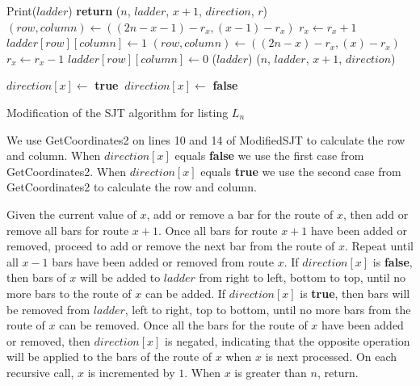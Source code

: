 \begin{algorithm}
  \begin{algorithmic}[1]
         {\sc Print}($ladder$)\EndIf
        \State \textbf{return}
      \EndIf
          ($n$, $ladder$, $x+1$, $direction$, $r$)
        \Else 
            \State $(row,column) \gets ((2n-x-1)-r_{x},(x-1)-r_{x})$
            \State $r_{x} \gets r_{x}+1$ 
            \State $ladder[row][column] \gets 1$
          \Else
            \State $(row,column) \gets ((2n-x)-r_{x},(x)-r_{x})$
            \State $r_{x} \gets r_{x}-1$ 
            \State $ladder[row][column] \gets 0$
          \EndIf
          ($ladder$)
          ($n$, $ladder$, $x+1$, $direction$)
        \EndIf
        
      \EndFor
       $direction[x] \gets$ \textbf{true}
      \Else $\: direction[x] \gets$ \textbf{false}
      \EndIf
    \EndFunction
  \end{algorithmic}
  \caption{Modification of the {\sc SJT} algorithm for listing $L_{n}$}
  \label{Alg:ModSJT}
\end{algorithm}


\pagebreak

We use {\sc GetCoordinates2} on lines 10 and 14 of {\sc ModifiedSJT} to calculate the row and column. 
When $direction[x]$ equals \textbf{false} we use the first case from 
{\sc GetCoordinates2}. When $direction[x]$ equals \textbf{true} we use the second case from 
{\sc GetCoordinates2} to calculate the row and column.\par 

Given the current value of $x$, add or remove a bar for the route of $x$, then add or remove 
all bars for route $x+1$. Once all bars for route $x+1$ have been added or removed, 
proceed to add or remove the next bar from the route of $x$. Repeat until all $x-1$ bars have been added or removed from route $x$.
If $direction[x]$ is \textbf{false}, then bars of $x$ will be added to 
$ladder$ from right to left, bottom to top, until no more bars to the route of $x$ can be added.
If $direction[x]$ is \textbf{true}, then bars will be removed from $ladder$, left to right, top to bottom, until 
no more bars from the route of $x$ can be removed. Once all the bars for the route of $x$ have 
been added or removed, then $direction[x]$ is negated,
indicating that the opposite operation will be applied to the bars of the route of $x$ when 
$x$ is next processed. On each recursive call, $x$ is 
incremented by $1$. When $x$ is greater than $n$, return. 

